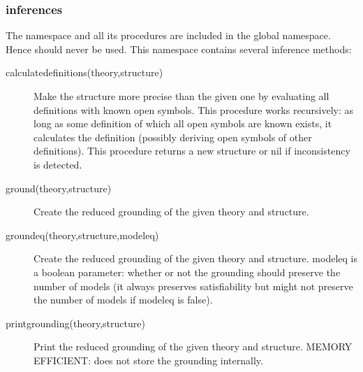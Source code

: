 \subsubsection{inferences}
The  namespace and all its procedures are included in the global namespace. Hence  should never be used. This namespace contains several inference methods:
\begin{description}
	\item[calculatedefinitions(theory,structure)]
		Make the structure more precise than the given one by evaluating all definitions with known open symbols. This procedure works recursively: as long as some definition of which all open symbols are known exists, it calculates the definition (possibly deriving open symbols of other definitions). This procedure returns a new structure or  nil if inconsistency is detected.
	\item[ground(theory,structure)]
 		Create the reduced grounding of the given theory and structure. 
 	\item[groundeq(theory,structure,modeleq)]
 		Create the reduced grounding of the given theory and structure. modeleq is a boolean parameter:  whether or not the grounding should preserve the number of models (it always preserves satisfiability but might not preserve the number of models if modeleq is false).
 	\item[printgrounding(theory,structure)]
 		Print the reduced grounding of the given theory and structure.
 		MEMORY EFFICIENT: does not store the grounding internally.
 		

\end{description}
